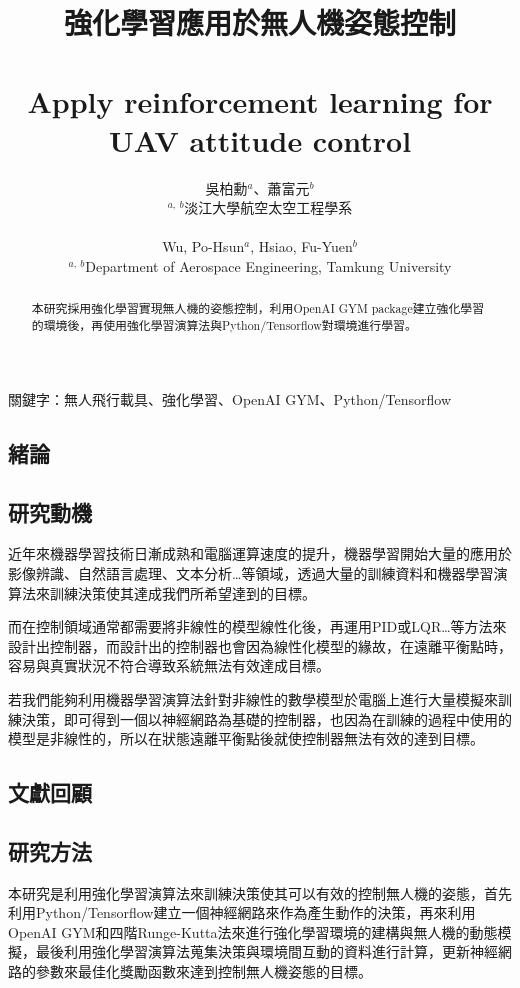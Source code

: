 \documentclass[a4paper, onecolumn, 11pt, AutoFakeBold]{article}
\title{\textfourteen
    \textbf{強化學習應用於無人機姿態控制}\\
    \ \\
    \textbf{Apply reinforcement learning for UAV attitude control}
}
\author{\texttwelve
    吳柏勳$^{a}$、蕭富元$^{b}$\\
    $^{a,\ b}$淡江大學航空太空工程學系\\
    \ \\
    Wu, Po-Hsun$^{a}$, Hsiao, Fu-Yuen$^{b}$\\
    $^{a,\ b}$Department of Aerospace Engineering, Tamkung University
}
\date{}
\newcommand{\textpt}[1]{\fontsize{#1}{#1}\selectfont}
\begin{document}
\maketitle
\thispagestyle{fancy}

\begin{abstract} \textpt{11}
本研究採用強化學習實現無人機的姿態控制，利用OpenAI GYM package建立強化學習的環境後，再使用強化學習演算法與Python/Tensorflow對環境進行學習。
\end{abstract}
\smallskip

關鍵字：無人飛行載具、強化學習、OpenAI GYM、Python/Tensorflow
\smallskip

\begin{multicols*}{2}

\section{緒論}
\subsection{研究動機}
\par
近年來機器學習技術日漸成熟和電腦運算速度的提升，機器學習開始大量的應用於影像辨識、自然語言處理、文本分析…等領域，透過大量的訓練資料和機器學習演算法來訓練決策使其達成我們所希望達到的目標。
\par
而在控制領域通常都需要將非線性的模型線性化後，再運用PID或LQR…等方法來設計出控制器，而設計出的控制器也會因為線性化模型的緣故，在遠離平衡點時，容易與真實狀況不符合導致系統無法有效達成目標。
\par
若我們能夠利用機器學習演算法針對非線性的數學模型於電腦上進行大量模擬來訓練決策，即可得到一個以神經網路為基礎的控制器，也因為在訓練的過程中使用的模型是非線性的，所以在狀態遠離平衡點後就使控制器無法有效的達到目標。

\smallskip
\subsection{文獻回顧}
\cite{Flight_Controller_Synthesis_Via_Deep_Reinforcement_Learning}
\cite{Reinforcement_Learning_for_UAV_Attitude_Control}
\cite{Optimal_Sliding_Mode_Controller_for_Fixed-wing_UAV}

\blindtext

\smallskip
\subsection{研究方法}
\par
本研究是利用強化學習演算法來訓練決策使其可以有效的控制無人機的姿態，首先利用Python/Tensorflow建立一個神經網路來作為產生動作的決策，再來利用OpenAI GYM和四階Runge-Kutta法來進行強化學習環境的建構與無人機的動態模擬，最後利用強化學習演算法蒐集決策與環境間互動的資料進行計算，更新神經網路的參數來最佳化獎勵函數來達到控制無人機姿態的目標。


\end{multicols*}
\end{document}
